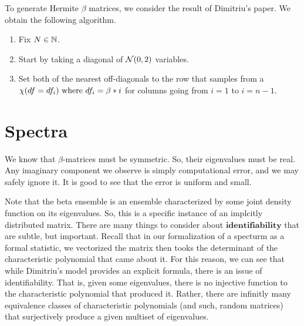 To generate Hermite $\beta$ matrices, we consider the result of Dimitriu's paper. We obtain the following algorithm.

\begin{algorithm} \hfill
  \begin{enumerate}
    \item Fix $N \in \mathbb{N}$.
    \item Start by taking a diagonal of $\mathcal{N}(0,2)$ variables.
    \item Set both of the nearest off-diagonals to the row that samples from a $\chi(df = df_i) \text{ where } df_i = \beta * i$ for columns going from $i = 1$ to $i = n-1$.
  \end{enumerate}
\end{algorithm}


\newpage
\section{Spectra}

We know that $\beta$-matrices must be symmetric. So, their eigenvalues must be real. Any imaginary component we observe is simply computational error, and we may safely ignore it. It is good to see that the error is uniform and small.

\begin{remark}
Note that the beta ensemble is an ensemble characterized by some joint density function on its eigenvalues. So, this is a specific instance of an implcitly distributed matrix. There are many things to consider about $\textbf{identifiability}$ that are subtle, but important. Recall that in our formalization of a specturm as a formal statistic, we vectorized the matrix then tooks the determinant of the characteristic polynomial that came about it. For this reason, we can see that while Dimitriu's model provides an explicit formula, there is an issue of identifiability. That is, given some eigenvalues, there is no injective function to the characteristic polynomial that produced it. Rather, there are infinitly many equivalence classes of characteristic polynomials (and such, random matrices) that surjectively produce a given multiset of eigenvalues.
\end{remark}


